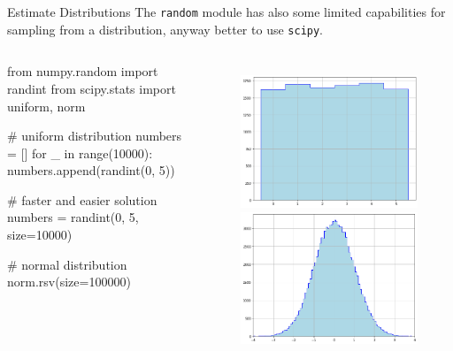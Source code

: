 \documentclass{beamer}
\begin{document}
\begin{frame}[fragile]{Estimate Distributions}
The \texttt{random} module has also some limited capabilities for sampling from a distribution, anyway 
better to use \texttt{scipy}.

\begin{columns}
\begin{ipython}
from numpy.random import randint
from scipy.stats import uniform, norm

# uniform distribution
numbers = []
for _ in range(10000):
    numbers.append(randint(0, 5))

# faster and easier solution
numbers = randint(0, 5, size=10000)    
    
# normal distribution
norm.rsv(size=100000)   
\end{ipython}
\begin{figure}[h]
    \begin{center}
    \includegraphics[width=0.55\linewidth]{uniform_distro}\\
    \includegraphics[width=0.55\linewidth]{gauss_distro}
    \end{center}
\end{figure}    
\end{columns}
\end{frame}
\end{document}
